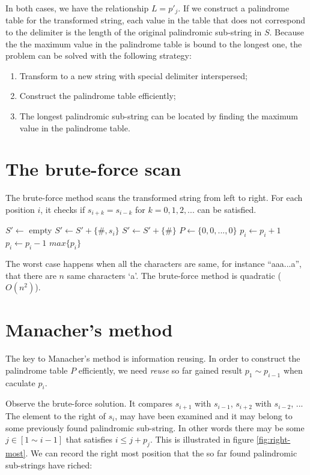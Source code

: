 \documentclass[b5paper]{article}
\begin{document}
In both cases, we have the relationship $L = p'_j$. If we construct a palindrome
table for the transformed string, each value in the table that does not correspond to the delimiter
is the length of the original palindromic sub-string in $S$.
Because the the maximum value in the palindrome table is bound to the longest
one, the problem can be solved with the following strategy:

\begin{enumerate}
\item Transform to a new string with special delimiter interspersed;
\item Construct the palindrome table efficiently;
\item The longest palindromic sub-string can be located by finding the maximum value
in the palindrome table.
\end{enumerate}

\section{The brute-force scan}
The brute-force method scans the transformed string from left to right. For each position
$i$, it checks if $s_{i+k} = s_{i-k}$ for $k = 0, 1, 2, ...$ can be satisfied.

\begin{algorithmic}[1]
  \State $S' \gets $ empty
    \State $S' \gets S' + \{\#, s_i\}$
  \EndFor
  \State $S' \gets S' + \{\#\}$
  \State $P \gets \{0, 0, ..., 0\}$ 
      \State $p_i \gets p_i + 1$
    \EndWhile
    \State $p_i \gets p_i - 1$
  \EndFor
  \State \Return $max\{p_i\}$
\EndFunction
\end{algorithmic}

The worst case happens when all the characters are same, for instance ``aaa...a'', that
there are $n$ same characters `a'. The brute-force method is quadratic ($O(n^2)$).

\section{Manacher's method}
The key to Manacher's method is information reusing. In order to construct
the palindrome table $P$ efficiently, we need {\em reuse} so far gained result
$p_1 \sim p_{i-1}$ when caculate $p_i$.

Observe the brute-force solution. It compares $s_{i+1}$ with $s_{i-1}$,
$s_{i+2}$ with $s_{i-2}$, ... The element to the right of $s_i$,
may have been examined and it may belong to some previously found palindromic
sub-string. In other words there may be some $j \in [1 \sim i-1]$ that satisfies
$i \leq j + p_j$. This is illustrated in figure \cref{fig:right-most}.
We can record the right most position that the so far found palindromic
sub-strings have riched:
\end{document}
